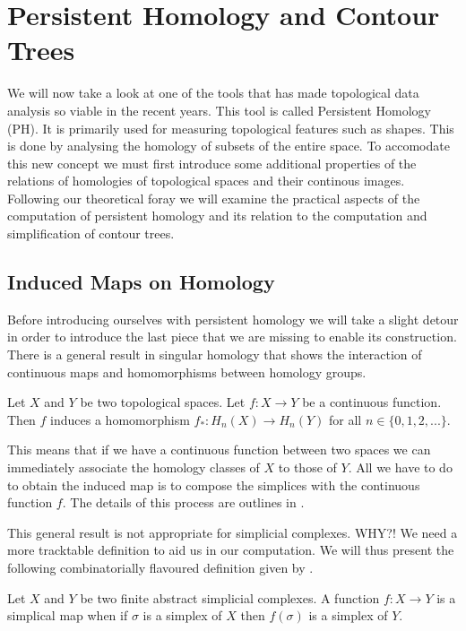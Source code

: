 \chapter{Persistent Homology and Contour Trees}
\label{chapter4}

We will now take a look at one of the tools that has made topological data analysis so viable in the recent years. This tool is called Persistent Homology (PH). It is primarily used for measuring topological features such as shapes. This is done by analysing the homology of subsets of the entire space. To accomodate this new concept we must first introduce some additional properties of the relations of homologies of topological spaces and their continous images. Following our theoretical foray we will examine the practical aspects of the computation of persistent homology and its relation to the computation and simplification of contour trees.

\section{Induced Maps on Homology}

Before introducing ourselves with persistent homology we will take a slight detour in order to introduce the last piece that we are missing to enable its construction. There is a general result in singular homology that shows the interaction of continuous maps and homomorphisms between homology groups.

\begin{defn} Let $X$ and $Y$ be two topological spaces. Let $f: X \to Y$ be a continuous function. Then $f$ induces a homomorphism $f_*: H_n(X) \to H_n(Y)$ for all $n \in \{0, 1, 2, ...\}$. \end{defn}

This means that if we have a continuous function between two spaces we can immediately associate the homology classes of $X$ to those of $Y$. All we have to do to obtain the induced map is to compose the simplices with the continuous function $f$. The details of this process are outlines in \cite{algebraic-topology}.


This general result is not appropriate for simplicial complexes. WHY?! We need a more tracktable definition to aid us in our computation. We will thus present the following combinatorially flavoured definition given by \cite{combinatorial-algebraic-topology}. 


\begin{defn} Let $X$ and $Y$ be two finite abstract simplicial complexes. A function $f: X \to Y$ is a simplical map when if $\sigma$ is a simplex of $X$ then $f(\sigma)$ is a simplex of $Y$. \end{defn}

